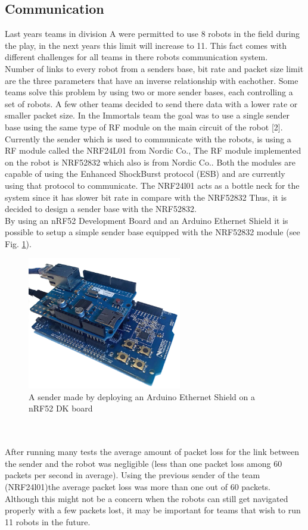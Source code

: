 \subsection{Communication}
Last years teams in division A were permitted to use 8 robots in the field during the play, in the next years this limit will increase to 11. This fact comes with different challenges for all teams in there robots communication system.\\
Number of links to every robot from a senders base, bit rate and packet size limit are the three parameters that have an inverse relationship with eachother. Some teams solve this problem by using two or more sender bases, each controlling a set of robots. A few other teams decided to send there data with a lower rate or smaller packet size. In the Immortals team the goal was to use a single sender base using the same type of RF module on the main circuit of the robot [2]. Currently the sender which is used to communicate with the robots, is using a RF module called the NRF24L01 from Nordic Co., The RF module implemented on the robot is NRF52832 which also is from Nordic Co.. Both the modules are capable of using the Enhanced ShockBurst protocol (ESB) and are currently using that protocol to communicate. The NRF24l01 acts as a bottle neck for the system since it has slower bit rate in compare with the NRF52832 Thus, it is decided to design a sender base with the NRF52832.\\
By using an nRF52 Development Board and an Arduino Ethernet Shield it is possible to setup a simple sender base equipped with the NRF52832 module (see Fig. \ref{fig:SIMPLE_SENDER}).\\
\begin{figure}
	\centering
	\includegraphics[width=0.6\textwidth]{images/NRF52832DK_ETH.png}
	\caption{A sender made by deploying an Arduino Ethernet Shield on a nRF52 DK board}
	\label{fig:SIMPLE_SENDER}
\end{figure}\\
\\
After running many tests the average amount of packet loss for the link between the sender and the robot was negligible (less than one packet loss among 60 packets per second in average). Using the previous sender of the team (NRF24l01)the average packet loss was more than one out of 60 packets. Although this might not be a concern when the robots can still get navigated properly with a few packets lost, it may be important for teams that wish to run 11 robots in the future.


